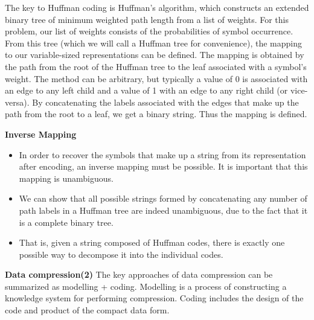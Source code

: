 {
The key to Huffman coding is Huffman's algorithm, which constructs an extended binary tree of minimum weighted path length from a list of weights. For this problem, our list of weights consists of the probabilities of symbol occurrence. From this tree (which we will call a Huffman tree for convenience), the mapping to our variable-sized representations can be defined.
}
{
The mapping is obtained by the path from the root of the Huffman tree to the leaf associated with a symbol's weight. The method can be arbitrary, but typically a value of 0 is associated with an edge to any left child and a value of 1 with an edge to any right child (or vice-versa). By concatenating the labels associated with the edges that make up the path from the root to a leaf, we get a binary string. Thus the mapping is defined.
}
{
\noindent \textbf{Inverse Mapping}
\begin{itemize}
\item In order to recover the symbols that make up a string from its representation after encoding, an inverse mapping must be possible. It is important that this mapping is unambiguous. \item We can show that all possible strings formed by concatenating any number of path labels in a Huffman tree are indeed unambiguous, due to the fact that it is a complete binary tree. \item That is, given a string composed of Huffman codes, there is exactly one possible way to decompose it into the individual codes.
\end{itemize}
}

{
\noindent \textbf{Data compression(2)}
The key approaches of data compression can be summarized as modelling + coding.
Modelling is a process of constructing a knowledge system for
performing compression. Coding includes the design of the code and product of the compact data form.

}















